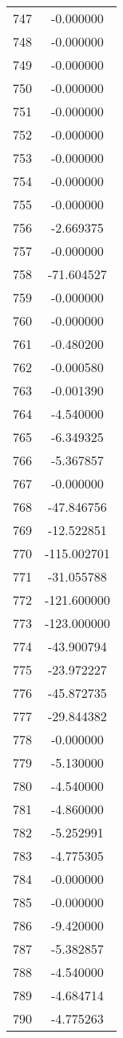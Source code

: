 \documentclass[12pt]{article}
\begin{document}
\begin{longtable}{@{}cc@{}}
747 & -0.000000 \\
748 & -0.000000 \\
749 & -0.000000 \\
750 & -0.000000 \\
751 & -0.000000 \\
752 & -0.000000 \\
753 & -0.000000 \\
754 & -0.000000 \\
755 & -0.000000 \\
756 & -2.669375 \\
757 & -0.000000 \\
758 & -71.604527 \\
759 & -0.000000 \\
760 & -0.000000 \\
761 & -0.480200 \\
762 & -0.000580 \\
763 & -0.001390 \\
764 & -4.540000 \\
765 & -6.349325 \\
766 & -5.367857 \\
767 & -0.000000 \\
768 & -47.846756 \\
769 & -12.522851 \\
770 & -115.002701 \\
771 & -31.055788 \\
772 & -121.600000 \\
773 & -123.000000 \\
774 & -43.900794 \\
775 & -23.972227 \\
776 & -45.872735 \\
777 & -29.844382 \\
778 & -0.000000 \\
779 & -5.130000 \\
780 & -4.540000 \\
781 & -4.860000 \\
782 & -5.252991 \\
783 & -4.775305 \\
784 & -0.000000 \\
785 & -0.000000 \\
786 & -9.420000 \\
787 & -5.382857 \\
788 & -4.540000 \\
789 & -4.684714 \\
790 & -4.775263 \\

\end{longtable}
\end{document}
